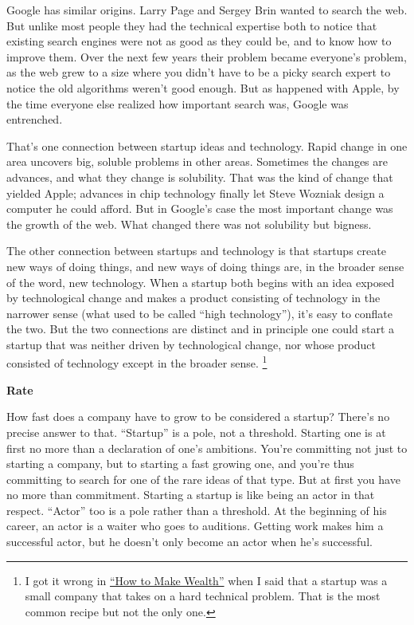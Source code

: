 Google has similar origins. Larry Page and Sergey Brin wanted to search
the web. But unlike most people they had the technical expertise both to
notice that existing search engines were not as good as they could be,
and to know how to improve them. Over the next few years their problem
became everyone's problem, as the web grew to a size where you didn't
have to be a picky search expert to notice the old algorithms weren't
good enough. But as happened with Apple, by the time everyone else
realized how important search was, Google was entrenched.

That's one connection between startup ideas and technology. Rapid change
in one area uncovers big, soluble problems in other areas. Sometimes the
changes are advances, and what they change is solubility. That was the
kind of change that yielded Apple; advances in chip technology finally
let Steve Wozniak design a computer he could afford. But in Google's
case the most important change was the growth of the web. What changed
there was not solubility but bigness.

The other connection between startups and technology is that startups
create new ways of doing things, and new ways of doing things are, in
the broader sense of the word, new technology. When a startup both
begins with an idea exposed by technological change and makes a product
consisting of technology in the narrower sense (what used to be called
``high technology''), it's easy to conflate the two. But the two
connections are distinct and in principle one could start a startup that
was neither driven by technological change, nor whose product consisted
of technology except in the broader sense. \footnote{I got it wrong in \href{wealth.html}{``How to Make Wealth''}
when I said that a startup was a small company that takes on a hard
technical problem. That is the most common recipe but not the only one.}

\textbf{Rate}

How fast does a company have to grow to be considered a startup? There's
no precise answer to that. ``Startup'' is a pole, not a threshold.
Starting one is at first no more than a declaration of one's ambitions.
You're committing not just to starting a company, but to starting a fast
growing one, and you're thus committing to search for one of the rare
ideas of that type. But at first you have no more than commitment.
Starting a startup is like being an actor in that respect. ``Actor'' too
is a pole rather than a threshold. At the beginning of his career, an
actor is a waiter who goes to auditions. Getting work makes him a
successful actor, but he doesn't only become an actor when he's
successful.

